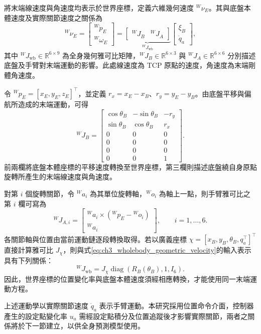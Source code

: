 將末端線速度與角速度均表示於世界座標，定義六維幾何速度 ${}^{W}\nu_E$。其與底盤本體速度及實際關節速度之關係為
\begin{equation}
    {}^{W}\nu_E
    =
    \begin{bmatrix}
        {}^{W}\dot{p}_E \\
        {}^{W}\omega_E
    \end{bmatrix}
    =
    \underbrace{
    \begin{bmatrix}
        {}^{W}J_B & {}^{W}J_A
    \end{bmatrix}}_{{}^{W}J_{\mathrm{wb}}}
    \begin{bmatrix}
        \xi_B \\
        \dot{q}_a
    \end{bmatrix},
    \label{eq:ch3_wholebody_geometric_velocity}
\end{equation}
其中 ${}^{W}J_{\mathrm{wb}}\in\mathbb{R}^{6\times 9}$ 為全身幾何雅可比矩陣，${}^{W}J_B\in\mathbb{R}^{6\times 3}$ 與 ${}^{W}J_A\in\mathbb{R}^{6\times 6}$ 分別描述底盤及手臂對末端運動的影響。此處線速度為 TCP 原點的速度，角速度為末端剛體角速度。

令 ${}^{W}p_E=[x_E,y_E,z_E]^{\top}$，並定義 $r_x=x_E-x_B$、$r_y=y_E-y_B$。由底盤平移與偏航所造成的末端運動，可得
\begin{equation}
    {}^{W}J_B=
    \begin{bmatrix}
        \cos\theta_B & -\sin\theta_B & -r_y \\
        \sin\theta_B & \cos\theta_B & r_x \\
        0 & 0 & 0 \\
        0 & 0 & 0 \\
        0 & 0 & 0 \\
        0 & 0 & 1
    \end{bmatrix}.
    \label{eq:ch3_base_geometric_jacobian}
\end{equation}
前兩欄將底盤本體座標的平移速度轉換至世界座標，第三欄則描述底盤繞自身原點旋轉所產生的末端線速度與角速度。

對第 $i$ 個旋轉關節，令 ${}^{W}a_i$ 為其單位旋轉軸，${}^{W}o_i$ 為軸上一點，則手臂雅可比之第 $i$ 欄可寫為
\begin{equation}
    {}^{W}J_{A,i}=
    \begin{bmatrix}
        {}^{W}a_i\times\left({}^{W}p_E-{}^{W}o_i\right) \\
        {}^{W}a_i
    \end{bmatrix},
    \qquad i=1,\ldots,6.
    \label{eq:ch3_arm_geometric_jacobian_column}
\end{equation}
各關節軸與位置由當前運動鏈逐段轉換取得。若以廣義座標 $\chi=[x_B,y_B,\theta_B,q_a^{\top}]^{\top}$ 直接計算雅可比 $J_{\chi}$，則與式\eqref{eq:ch3_wholebody_geometric_velocity}的輸入表示具有下列關係：
\begin{equation}
    {}^{W}J_{\mathrm{wb}}
    =J_{\chi}\operatorname{diag}\!\left(R_B(\theta_B),1,I_6\right).
    \label{eq:ch3_jacobian_velocity_coordinate_mapping}
\end{equation}
因此，世界座標的位置變化率與底盤本體速度須經相應轉換，才能使用同一末端運動方程。

上述運動學以實際關節速度 $\dot{q}_a$ 表示手臂運動。本研究採用位置命令介面，控制器產生的設定點變化率 $u_a$ 需經設定點積分及位置追蹤後才影響實際關節，兩者之關係將於下一節建立，以供全身預測模型使用。
